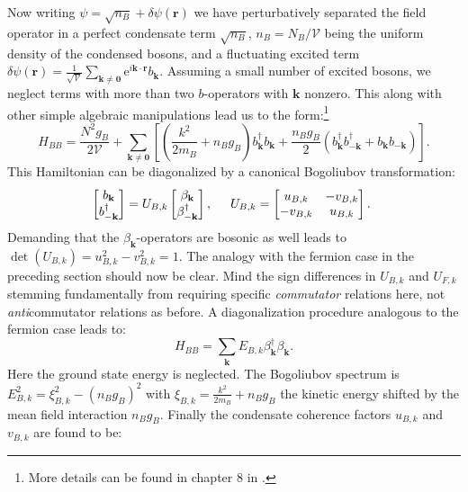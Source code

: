 Now writing $\psi = \sqrt{n_B} + \delta \psi(\mathbf{r})$ we have perturbatively separated the field operator in a perfect condensate term $\sqrt{n_B}$, $n_B = N_B/\mathcal{V}$ being the uniform density of the condensed bosons, and a fluctuating excited term $\delta \psi(\mathbf{r}) =  \frac{1}{\sqrt{\mathcal{V}}}\sum_{\mathbf{k}\neq \mathbf{0}} \text{e}^{i\mathbf{k}\cdot\mathbf{r}}b_\mathbf{k}$. Assuming a small number of excited bosons, we neglect terms with more than two $b$-operators with $\mathbf{k}$ nonzero. This along with other simple algebraic manipulations lead us to the form:\footnote{More details can be found in chapter 8 in \cite{Pethick}.} 
\begin{equation}
H_{BB} = \frac{N^2g_B}{2\mathcal{V}} + \sum_{\mathbf{k}\neq \mathbf{0}}\left[\left(\frac{k^2}{2m_B}+n_Bg_B\right)b_\mathbf{k}^\dagger b_\mathbf{k} + \frac{n_Bg_B}{2}\left( b_\mathbf{k}^\dagger b_{-\mathbf{k}}^\dagger + b_{\mathbf{k}} b_{-\mathbf{k}} \right) \right].
\label{eq.bosonHamiltonian}
\end{equation}
This Hamiltonian can be diagonalized by a canonical Bogoliubov transformation:
\begin{equation}
\begin{bmatrix} b_\mathbf{k} \\ b^\dagger_{-\mathbf{k}} \end{bmatrix} = U_{B,k} \begin{bmatrix} \beta_\mathbf{k} \\ \beta^\dagger_{-\mathbf{k}}\end{bmatrix}, \hspace{0.5cm} U_{B,k} = \begin{bmatrix} u_{B,k} & -v_{B,k} \\ -v_{B,k} & u_{B,k} \end{bmatrix}. 
\end{equation}
Demanding that the $\beta_\mathbf{k}$-operators are bosonic as well leads to $\det(U_{B,k}) = u_{B,k}^2-v_{B,k}^2=1$. The analogy with the fermion case in the preceding section should now be clear. Mind the sign differences in $U_{B,k}$ and $U_{F,k}$ stemming fundamentally from requiring specific \textit{commutator} relations here, not \textit{anti}commutator relations as before. A diagonalization procedure analogous to the fermion case leads to: 
\begin{equation}
H_{BB} = \sum_\mathbf{k} E_{B,k} \beta_\mathbf{k}^\dagger \beta_\mathbf{k}. 
\end{equation}
Here the ground state energy is neglected. The Bogoliubov spectrum is $E_{B,k}^2 = \xi_{B,k}^2-(n_Bg_B)^2$ with $\xi_{B,k} = \frac{k^2}{2m_B}+n_Bg_B$ the kinetic energy shifted by the mean field interaction $n_Bg_B$. Finally the condensate coherence factors $u_{B,k}$ and $v_{B,k}$ are found to be: 

